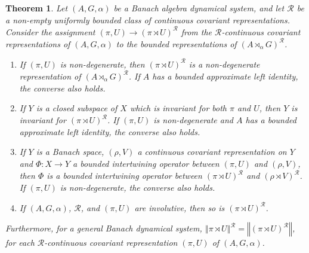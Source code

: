 \documentclass{amsart}
\theoremstyle{plain}
\newtheorem{theorem}{Theorem}[section]
\theoremstyle{definition}
\numberwithin{equation}{section}
\begin{document}
\begin{theorem}\label{t:summary_from_dyn_sys_to_crossed_product}
Let ${(A,G,\alpha)}$ be a Banach algebra dynamical system, and let $\mathcal{R}$ be a non-empty uniformly bounded class of continuous covariant representations. Consider the assignment ${(\pi,U)} \to ({\pi \rtimes U})^{\mathcal R}$ from the ${\mathcal R}$-continuous covariant representations of ${(A,G,\alpha)}$ to the bounded representations of ${(A {\rtimes}_\alpha G)^\mathcal{R}}$.
\begin{enumerate}
 \item If ${(\pi,U)}$ is non-degenerate, then ${(\pi \rtimes U)^\mathcal R}$ is a non-degenerate representation of ${(A {\rtimes}_\alpha G)^\mathcal{R}}$. If $A$ has a bounded approximate left identity, the converse also holds.
 \item If $Y$ is a closed subspace of $X$ which is invariant for both $\pi$ and $U$, then $Y$ is invariant for ${(\pi \rtimes U)^\mathcal R}$. If ${(\pi,U)}$ is non-degenerate and $A$ has a bounded approximate left identity, the converse also holds.
 \item If $Y$ is a Banach space, $(\rho, V)$ a continuous covariant representation on $Y$ and $\Phi: X \to Y$ a bounded intertwining operator between ${(\pi,U)}$ and $(\rho,V)$, then $\Phi$ is a bounded intertwining operator between ${(\pi \rtimes U)^\mathcal R}$ and $(\rho {\rtimes} V)^{\mathcal R}$. If ${(\pi,U)}$ is non-degenerate, the converse also holds.
 \item If ${(A,G,\alpha)}$, ${\mathcal R}$, and ${(\pi,U)}$ are involutive, then so is ${(\pi \rtimes U)^\mathcal R}$.
\end{enumerate}

Furthermore, for a general Banach dynamical system, ${\left\Vert {\pi \rtimes U} \right\Vert^{\mathcal R}}={\left\Vert {({\pi \rtimes U})^{\mathcal R}} \right\Vert}$, for each ${\mathcal R}$-continuous covariant representation ${(\pi,U)}$ of ${(A,G,\alpha)}$.
\end{theorem}
\end{document}

